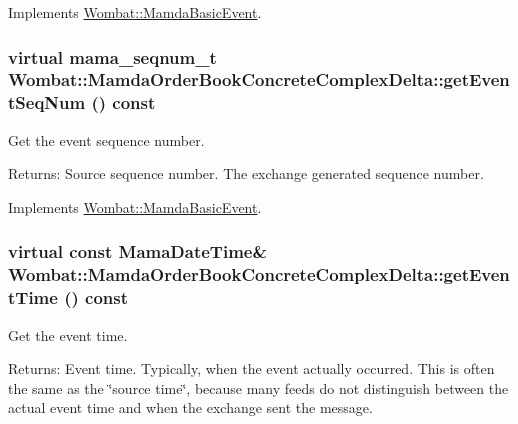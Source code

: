 Implements \hyperlink{classWombat_1_1MamdaBasicEvent_94e531c6ae9ae7798725db14facbd6e2}{Wombat::Mamda\-Basic\-Event}.\hypertarget{classWombat_1_1MamdaOrderBookConcreteComplexDelta_3d8aa02a57d01ca4b42fde98a1c8b2dc}{
\subsubsection[getEventSeqNum]{\setlength{\rightskip}{0pt plus 5cm}virtual mama\_\-seqnum\_\-t Wombat::Mamda\-Order\-Book\-Concrete\-Complex\-Delta::get\-Event\-Seq\-Num () const}}
\label{classWombat_1_1MamdaOrderBookConcreteComplexDelta_3d8aa02a57d01ca4b42fde98a1c8b2dc}


Get the event sequence number. 

\begin{Desc}
\item[Returns:]Source sequence number. The exchange generated sequence number. \end{Desc}


Implements \hyperlink{classWombat_1_1MamdaBasicEvent_1fd845d48e95b4ee3beafc72d1ac2adf}{Wombat::Mamda\-Basic\-Event}.\hypertarget{classWombat_1_1MamdaOrderBookConcreteComplexDelta_a28362473a741fbcf14382a30f402777}{
\subsubsection[getEventTime]{\setlength{\rightskip}{0pt plus 5cm}virtual const Mama\-Date\-Time\& Wombat::Mamda\-Order\-Book\-Concrete\-Complex\-Delta::get\-Event\-Time () const}}
\label{classWombat_1_1MamdaOrderBookConcreteComplexDelta_a28362473a741fbcf14382a30f402777}


Get the event time. 

\begin{Desc}
\item[Returns:]Event time. Typically, when the event actually occurred. This is often the same as the \char`\"{}source time\char`\"{}, because many feeds do not distinguish between the actual event time and when the exchange sent the message. \end{Desc}


